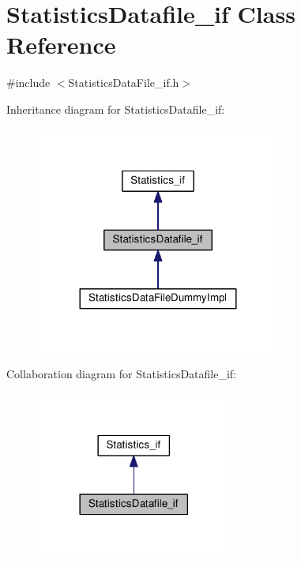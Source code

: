 \hypertarget{class_statistics_datafile__if}{}\section{Statistics\+Datafile\+\_\+if Class Reference}
\label{class_statistics_datafile__if}


{\ttfamily \#include $<$Statistics\+Data\+File\+\_\+if.\+h$>$}



Inheritance diagram for Statistics\+Datafile\+\_\+if\+:\nopagebreak
\begin{figure}[H]
\begin{center}
\leavevmode
\includegraphics[width=228pt]{class_statistics_datafile__if__inherit__graph}
\end{center}
\end{figure}


Collaboration diagram for Statistics\+Datafile\+\_\+if\+:\nopagebreak
\begin{figure}[H]
\begin{center}
\leavevmode
\includegraphics[width=182pt]{class_statistics_datafile__if__coll__graph}
\end{center}
\end{figure}
